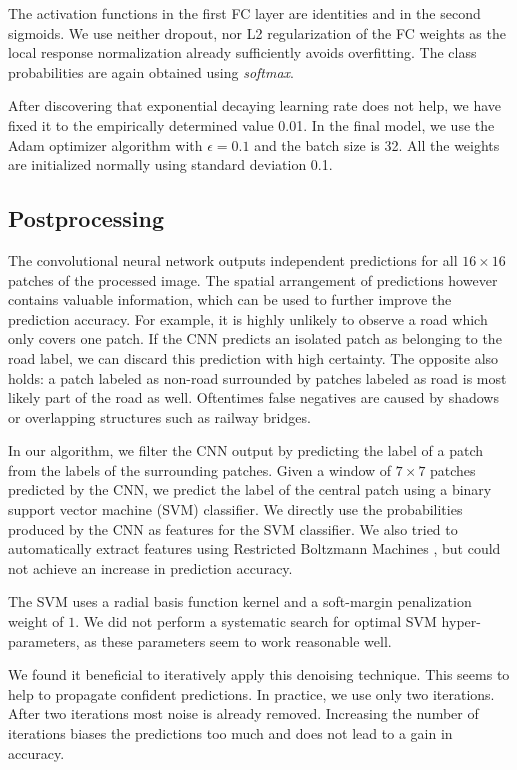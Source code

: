 \documentclass[10pt,conference,compsocconf]{IEEEtran}
\begin{document}
The activation functions in the first FC layer are identities and in the second sigmoids. We use neither dropout, nor L2 regularization of the FC weights as the local response normalization already sufficiently avoids overfitting. The class probabilities are again obtained using \textit{softmax}.

After discovering that exponential decaying learning rate does not help, we have fixed it to the empirically determined value 0.01. 
In the final model, we use the Adam optimizer algorithm \cite{Adam.2014} with $ \epsilon = 0.1 $ and the batch size is 32. All the weights are initialized normally using standard deviation 0.1.


\subsection{Postprocessing}
The convolutional neural network outputs independent predictions for all $ 16 \times 16 $ patches of the processed image. The spatial arrangement of predictions however contains valuable information, which can be used to further improve the prediction accuracy. For example, it is highly unlikely to observe a road which only covers one patch. If the CNN predicts an isolated patch as belonging to the road label, we can discard this prediction with high certainty. The opposite also holds: a patch labeled as non-road surrounded by patches labeled as road is most likely part of the road as well. Oftentimes false negatives are caused by shadows or overlapping structures such as railway bridges.

\par 
In our algorithm, we filter the CNN output by predicting the label of a patch from the labels of the surrounding patches. Given a window of $ 7 \times 7 $ patches predicted by the CNN, we predict the label of the central patch using a binary support vector machine (SVM) classifier. We directly use the probabilities produced by the CNN as features for the SVM classifier. We also tried to automatically extract features using Restricted Boltzmann Machines \cite{smolensky.1986}, but could not achieve an increase in prediction accuracy.
\par
The SVM uses a radial basis function kernel and a soft-margin penalization weight of $ 1 $. We did not perform a systematic search for optimal SVM hyper-parameters, as these parameters seem to work reasonable well.
\par 
We found it beneficial to iteratively apply this denoising technique. This seems to help to propagate confident predictions. In practice, we use only two iterations. After two iterations most noise is already removed. Increasing the number of iterations biases the predictions too much and does not lead to a gain in accuracy.
\end{document}
